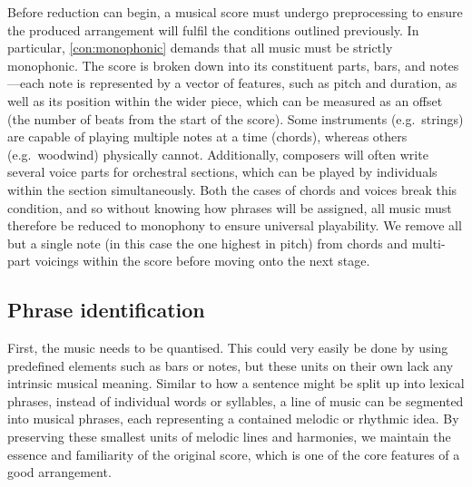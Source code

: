 \documentclass[twocolumn]{article}
\theoremstyle{definition}
\begin{document}
Before reduction can begin, a musical score must undergo preprocessing to ensure the produced arrangement will fulfil the conditions outlined previously. In particular, \cref{con:monophonic} demands that all music must be strictly monophonic. The score is broken down into its constituent parts, bars, and notes---each note is represented by a vector of features, such as pitch and duration, as well as its position within the wider piece, which can be measured as an offset (the number of beats from the start of the score). Some instruments (e.g.\ strings) are capable of playing multiple notes at a time (chords), whereas others (e.g.\ woodwind) physically cannot. Additionally, composers will often write several voice parts for orchestral sections, which can be played by individuals within the section simultaneously. Both the cases of chords and voices break this condition, and so without knowing how phrases will be assigned, all music must therefore be reduced to monophony to ensure universal playability. We remove all but a single note (in this case the one highest in pitch) from chords and multi-part voicings within the score before moving onto the next stage.

\subsection*{Phrase identification}

First, the music needs to be quantised. This could very easily be done by using predefined elements such as bars or notes, but these units on their own lack any intrinsic musical meaning. Similar to how a sentence might be split up into lexical phrases, instead of individual words or syllables, a line of music can be segmented into musical phrases, each representing a contained melodic or rhythmic idea. By preserving these smallest units of melodic lines and harmonies, we maintain the essence and familiarity of the original score, which is one of the core features of a good arrangement.
\end{document}
